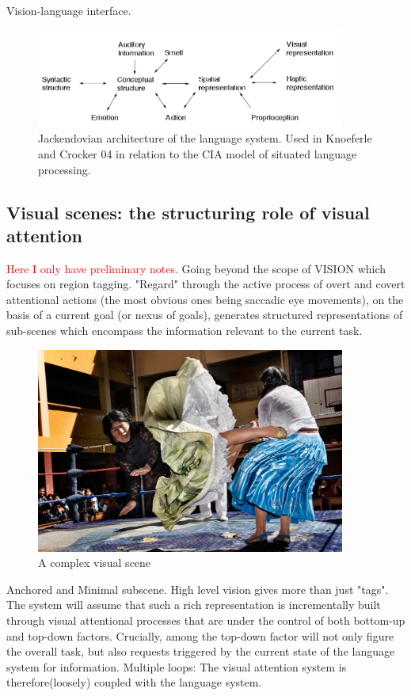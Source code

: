 \documentclass{article}
\newcommand\todo[1]{\textcolor{red}{#1}}
\begin{document}
Vision-language interface.

\begin{figure}[!htbp]
	\centering
	\includegraphics[width=4.0in]{Figures/Knoeferle&Crocker(04)_Jackendoff97.png}
	\caption{Jackendovian architecture of the language system. Used in Knoeferle and Crocker 04 in relation to the CIA model of situated language processing.}
	\label{jackendoff_arch}
\end{figure}

\subsection{Visual scenes: the structuring role of visual attention}
\todo{Here I only have preliminary notes.}
Going beyond the scope of VISION which focuses on region tagging.
"Regard" through the active process of overt and covert attentional actions (the most obvious ones being saccadic eye movements), on the basis of a current goal (or nexus of goals), generates structured representations of sub-scenes which encompass the information relevant to the current task.

\begin{figure}[H]
	\centering
	\includegraphics[width=4.0in]{Figures/cholitas.jpg}
	\caption{A complex visual scene}
	\label{visual_scene_example}
\end{figure}

Anchored and Minimal subscene.
High level vision gives more than just "tags". The system will assume that such a rich representation is incrementally built through visual attentional processes that are under the control of both bottom-up and top-down factors. Crucially, among the top-down factor will not only figure the overall task, but also requests triggered by the current state of the language system for information.
Multiple loops: The visual attention system is therefore(loosely) coupled with the language system.
\end{document}

